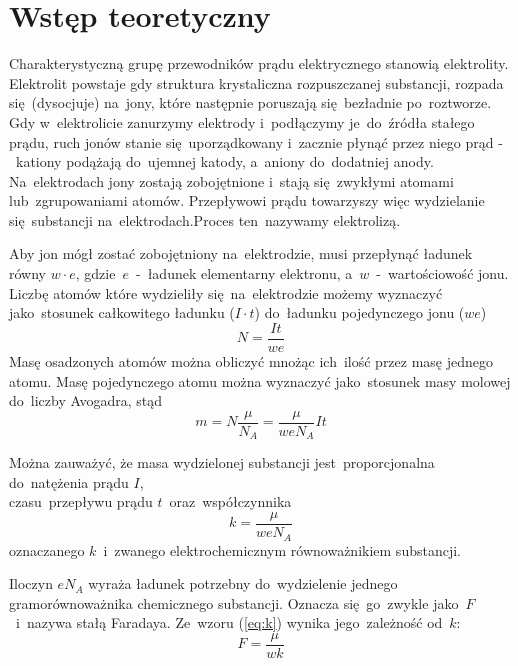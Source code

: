 \documentclass{fizraport}
\begin{document}
\maketitle

\section{Wstęp teoretyczny}
Charakterystyczną grupę przewodników prądu elektrycznego stanowią elektrolity. Elektrolit powstaje gdy struktura krystaliczna rozpuszczanej substancji, rozpada się~(dysocjuje) na~jony, które następnie poruszają się~bezładnie po~roztworze. Gdy w~elektrolicie zanurzymy elektrody i~podłączymy je~do~źródła stałego prądu,
ruch jonów stanie się~uporządkowany i~zacznie płynąć przez niego prąd -~kationy podążają do~ujemnej katody, a~aniony do~dodatniej anody.
Na~elektrodach jony zostają zobojętnione i~stają się~zwykłymi atomami lub~zgrupowaniami atomów. Przepływowi prądu towarzyszy więc wydzielanie się~substancji na~elektrodach.Proces ten~nazywamy elektrolizą. 

Aby jon mógł zostać zobojętniony na~elektrodzie, musi przepłynąć ładunek równy $w\cdot e$, gdzie~$e$~-~ładunek elementarny elektronu, a~$w$~-~wartościowość jonu.
Liczbę atomów które wydzieliły się~na~elektrodzie możemy wyznaczyć jako~stosunek całkowitego ładunku ($I \cdot t$) do~ładunku pojedynczego jonu ($we$)
\begin{equation}
N=\frac{It}{we}
\end{equation}
Masę osadzonych atomów można obliczyć mnożąc ich~ilość przez masę jednego atomu. Masę pojedynczego atomu można wyznaczyć jako~stosunek masy molowej do~liczby Avogadra, stąd
\begin{equation}
\label{eq:masa}
m=N\frac{\mu}{N_A}=\frac{\mu}{weN_A}It
\end{equation}

Można zauważyć, że masa wydzielonej substancji jest~proporcjonalna do~natężenia prądu $I$,\\ czasu~przepływu prądu $t$~oraz~współczynnika 
\begin{equation}
\label{eq:k}
k=\frac{\mu}{weN_A}
\end{equation}
oznaczanego $k$~i~zwanego elektrochemicznym równoważnikiem substancji.

Iloczyn $eN_A$ wyraża ładunek potrzebny do~wydzielenie jednego gramorównoważnika chemicznego substancji. Oznacza się~go~zwykle jako~$F$~i~nazywa stałą Faradaya.
Ze~wzoru (\ref{eq:k}) wynika jego~zależność od~$k$:
\begin{equation}
F=\frac{\mu}{wk}
\end{equation}
\end{document}
